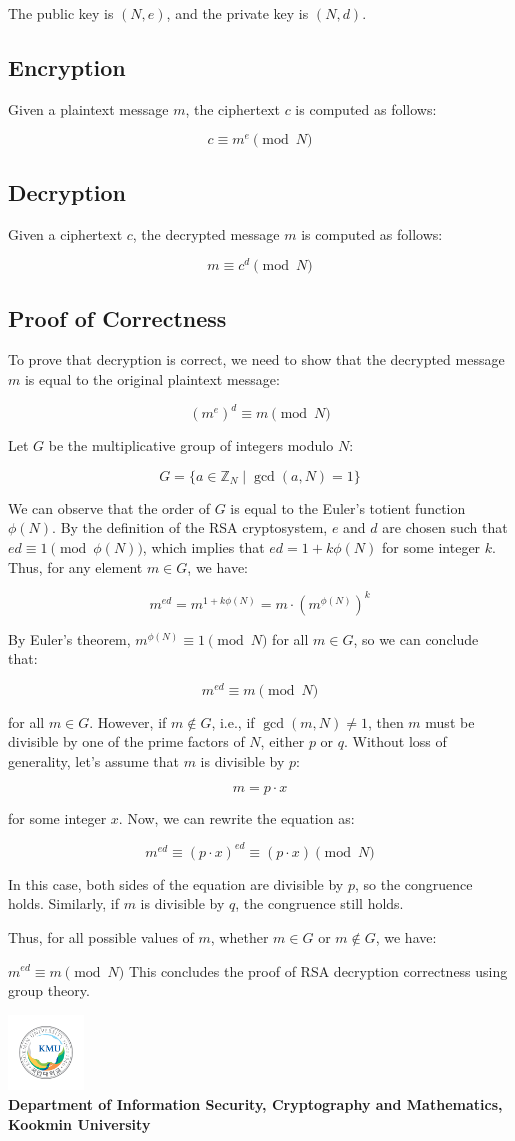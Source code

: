 \documentclass{article}
\newcommand{\footer}[1]{
\begin{flushright}
	\vspace{2em}
	\includegraphics[width=2cm]{school_logo.jpg} \\
	\vspace{1em}
	\textcolor{blue2}{\small\textbf{#1}}
\end{flushright}
}
\theoremstyle{definition}
\begin{document}
	The public key is $(N, e)$, and the private key is $(N, d)$.
	
	\subsection*{Encryption}
	Given a plaintext message $m$, the ciphertext $c$ is computed as follows:
	
	\[
	c \equiv m^e \pmod{N}
	\]
	
	\subsection*{Decryption}
	Given a ciphertext $c$, the decrypted message $m$ is computed as follows:
	
	\[
	m \equiv c^d \pmod{N}
	\]
	
	\subsection*{Proof of Correctness}
	To prove that decryption is correct, we need to show that the decrypted message $m$ is equal to the original plaintext message:
	
	\[
	(m^e)^d \equiv m \pmod{N}
	\]
	
	Let $G$ be the multiplicative group of integers modulo $N$:
	
	\[
	G = \{a \in \mathbb{Z}_N \mid \gcd(a, N) = 1\}
	\]
	
	We can observe that the order of $G$ is equal to the Euler's totient function $\phi(N)$. By the definition of the RSA cryptosystem, $e$ and $d$ are chosen such that $ed \equiv 1 \pmod{\phi(N)}$, which implies that $ed = 1 + k\phi(N)$ for some integer $k$. Thus, for any element $m \in G$, we have:
	
	\[
	m^{ed} = m^{1 + k\phi(N)} = m \cdot (m^{\phi(N)})^k
	\]
	
	By Euler's theorem, $m^{\phi(N)} \equiv 1 \pmod{N}$ for all $m \in G$, so we can conclude that:
	
	\[
	m^{ed} \equiv m \pmod{N}
	\]
	
	for all $m \in G$. However, if $m \notin G$, i.e., if $\gcd(m, N) \neq 1$, then $m$ must be divisible by one of the prime factors of $N$, either $p$ or $q$. Without loss of generality, let's assume that $m$ is divisible by $p$:
	
	\[
	m = p \cdot x
	\]
	
	for some integer $x$. Now, we can rewrite the equation as:
	
	\[
	m^{ed} \equiv (p \cdot x)^{ed} \equiv (p \cdot x) \pmod{N}
	\]
	
	In this case, both sides of the equation are divisible by $p$, so the congruence holds. Similarly, if $m$ is divisible by $q$, the congruence still holds.
	
	Thus, for all possible values of $m$, whether $m \in G$ or $m \notin G$, we have:
	
	$m^{ed}\equiv m\pmod{N}$
	This concludes the proof of RSA decryption correctness using group theory.

\footer{Department of Information Security, Cryptography and Mathematics, Kookmin University}
\end{document}
